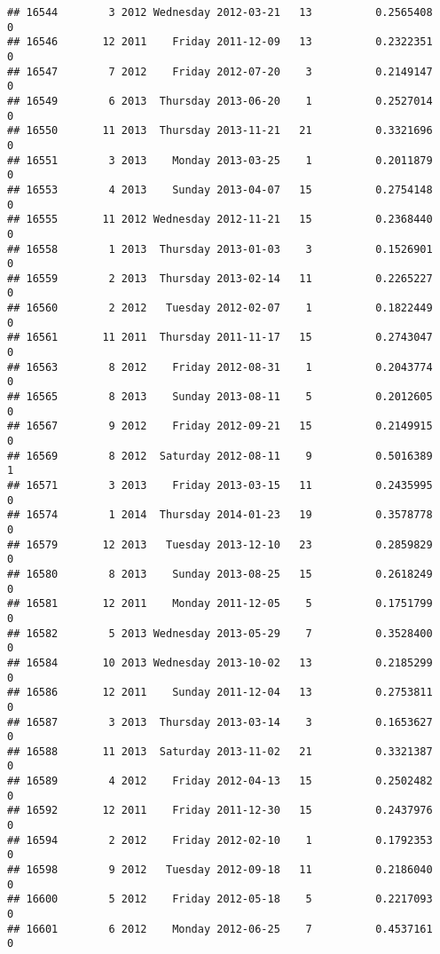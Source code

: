 \documentclass[
]{article}
\begin{document}
\begin{verbatim}
## 16544        3 2012 Wednesday 2012-03-21   13          0.2565408             0
## 16546       12 2011    Friday 2011-12-09   13          0.2322351             0
## 16547        7 2012    Friday 2012-07-20    3          0.2149147             0
## 16549        6 2013  Thursday 2013-06-20    1          0.2527014             0
## 16550       11 2013  Thursday 2013-11-21   21          0.3321696             0
## 16551        3 2013    Monday 2013-03-25    1          0.2011879             0
## 16553        4 2013    Sunday 2013-04-07   15          0.2754148             0
## 16555       11 2012 Wednesday 2012-11-21   15          0.2368440             0
## 16558        1 2013  Thursday 2013-01-03    3          0.1526901             0
## 16559        2 2013  Thursday 2013-02-14   11          0.2265227             0
## 16560        2 2012   Tuesday 2012-02-07    1          0.1822449             0
## 16561       11 2011  Thursday 2011-11-17   15          0.2743047             0
## 16563        8 2012    Friday 2012-08-31    1          0.2043774             0
## 16565        8 2013    Sunday 2013-08-11    5          0.2012605             0
## 16567        9 2012    Friday 2012-09-21   15          0.2149915             0
## 16569        8 2012  Saturday 2012-08-11    9          0.5016389             1
## 16571        3 2013    Friday 2013-03-15   11          0.2435995             0
## 16574        1 2014  Thursday 2014-01-23   19          0.3578778             0
## 16579       12 2013   Tuesday 2013-12-10   23          0.2859829             0
## 16580        8 2013    Sunday 2013-08-25   15          0.2618249             0
## 16581       12 2011    Monday 2011-12-05    5          0.1751799             0
## 16582        5 2013 Wednesday 2013-05-29    7          0.3528400             0
## 16584       10 2013 Wednesday 2013-10-02   13          0.2185299             0
## 16586       12 2011    Sunday 2011-12-04   13          0.2753811             0
## 16587        3 2013  Thursday 2013-03-14    3          0.1653627             0
## 16588       11 2013  Saturday 2013-11-02   21          0.3321387             0
## 16589        4 2012    Friday 2012-04-13   15          0.2502482             0
## 16592       12 2011    Friday 2011-12-30   15          0.2437976             0
## 16594        2 2012    Friday 2012-02-10    1          0.1792353             0
## 16598        9 2012   Tuesday 2012-09-18   11          0.2186040             0
## 16600        5 2012    Friday 2012-05-18    5          0.2217093             0
## 16601        6 2012    Monday 2012-06-25    7          0.4537161             0

\end{verbatim}
\end{document}
